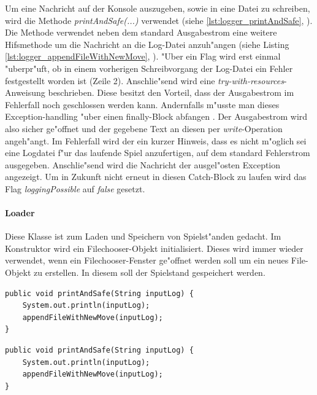 Um eine Nachricht auf der Konsole auszugeben, sowie in eine Datei zu schreiben, wird die Methode \emph{printAndSafe(...)} verwendet (siehe \ref{lst:logger_printAndSafe}, ). Die Methode verwendet neben dem standard Ausgabestrom eine weitere Hifsmethode um die Nachricht an die Log-Datei anzuh"angen (siehe Listing \ref{lst:logger_appendFileWithNewMove}, ). "Uber ein Flag wird erst einmal "uberpr"uft, ob in einem vorherigen Schreibvorgang der Log-Datei ein Fehler festgestellt worden ist (Zeile 2). Anschlie"send wird eine \emph{try-with-resources}-Anweisung beschrieben. Diese besitzt den Vorteil, dass der Ausgabestrom im Fehlerfall noch geschlossen werden kann. Andernfalls m"usste man dieses Exception-handling "uber einen finally-Block abfangen
\cite{try-with-resources}
. Der Ausgabestrom wird also sicher ge"offnet und der gegebene Text an diesen per \emph{write}-Operation angeh"angt. Im Fehlerfall wird der ein kurzer Hinweis, dass es nicht m"oglich sei eine Logdatei f"ur das laufende Spiel anzufertigen, auf dem standard Fehlerstrom ausgegeben. Anschlie"send wird die Nachricht der ausgel"osten Exception angezeigt. Um in Zukunft nicht erneut in diesen Catch-Block zu laufen wird das Flag \emph{loggingPossible} auf \emph{false} gesetzt. 

\paragraph{Loader}
\label{par:loader}
Diese Klasse ist zum Laden und Speichern von Spielst"anden gedacht. Im Konstruktor wird ein Filechooser-Objekt initialisiert. Dieses wird immer wieder verwendet, wenn ein Filechooser-Fenster ge"offnet werden soll um ein neues File-Objekt zu erstellen. In diesem soll der Spielstand gespeichert werden.

\begin{lstlisting}[float,style=CodeHighlighting,caption=Logger - printAndSafe,label=lst:logger_printAndSafe]
public void printAndSafe(String inputLog) {
    System.out.println(inputLog);
    appendFileWithNewMove(inputLog);
}
\end{lstlisting}

\begin{lstlisting}[float,style=CodeHighlighting,caption=Logger - printAndSafe,label=lst:logger_printAndSafe]
public void printAndSafe(String inputLog) {
    System.out.println(inputLog);
    appendFileWithNewMove(inputLog);
}
\end{lstlisting}

